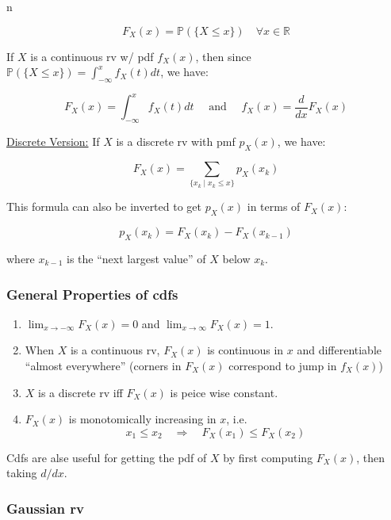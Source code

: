 n\documentclass{article}
\begin{document}
\begin{equation}
  \tag{Cdf Definition: Continuous}
  \boxed{
    F_X(x) = \mathbb{P}(\{X\leq x\}) \quad \forall x \in \mathbb{R}
  }
\end{equation}

If $X$ is a continuous rv w/ pdf $f_X(x)$, then since
$\mathbb{P}(\{X\leq x\}) = \int_{-\infty}^x f_X(t)dt$, we have:

\[
  F_X(x) = \int_{-\infty}^x f_X(t)dt \quad \text{ and } \quad
  f_X(x) = \frac{d}{dx} F_X(x)
\]

\underline{Discrete Version:} If $X$ is a discrete rv with pmf $p_X(x)$,
we have:

\begin{equation}
  \tag{Cdf Definition: Discrete}
  \boxed{
    F_X(x) = \sum_{\{x_k \mid x_k \leq x\}} p_X(x_k)
  }
\end{equation}

This formula can also be inverted to get $p_X(x)$ in terms of
$F_X(x)$:

\[
  p_X(x_k) = F_X(x_k) - F_X(x_{k-1})
\]

where $x_{k-1}$ is the ``next largest value'' of $X$ below $x_k$.

\subsubsection{General Properties of cdfs}

\begin{enumerate}
\item $\lim_{x\to-\infty}F_X(x) = 0$ and $\lim_{x\to\infty}F_X(x) = 1$.
  
\item When $X$ is a continuous rv, $F_X(x)$ is continuous in $x$ and
  differentiable ``almost everywhere'' (corners in $F_X(x)$ correspond
  to jump in $f_X(x)$)

\item $X$ is a discrete rv iff $F_X(x)$ is peice wise constant.

\item $F_X(x)$ is monotomically increasing in $x$, i.e.
  \[
    x_1 \leq x_2 \quad \Rightarrow \quad F_X(x_1) \leq F_X(x_2)
  \]
\end{enumerate}

Cdfs are alse useful for getting the pdf of $X$ by first computing
$F_X(x)$, then taking $d/dx$.

\subsubsection{Gaussian rv}
\end{document}
